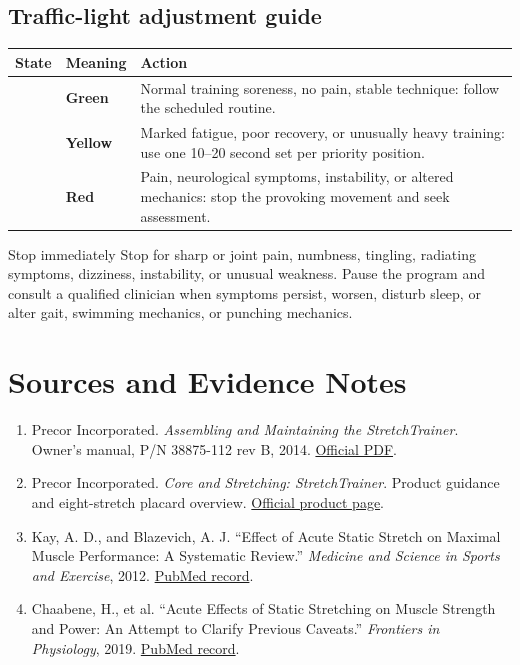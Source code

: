 \documentclass[10pt,letterpaper]{article}
\newcommand{\sourceurl}[2]{\href{#1}{#2}}
\begin{document}
\subsection{Traffic-light adjustment guide}

\begin{tabularx}{\textwidth}{@{}C{0.62in}L{1.25in}Y@{}}
\toprule
{}
\color{white}\textbf{State} & \color{white}\textbf{Meaning} & \color{white}\textbf{Action} \\
\midrule
{}\textcolor{Safe}{\Large{}} & \textbf{Green} & Normal training soreness, no pain, stable technique: follow the scheduled routine. \\
\textcolor{Caution}{\Large{}} & \textbf{Yellow} & Marked fatigue, poor recovery, or unusually heavy training: use one 10--20 second set per priority position. \\
\textcolor{Stop}{\Large{}} & \textbf{Red} & Pain, neurological symptoms, instability, or altered mechanics: stop the provoking movement and seek assessment. \\
\bottomrule
\end{tabularx}

\begin{warningbox}{Stop immediately}
Stop for sharp or joint pain, numbness, tingling, radiating symptoms, dizziness, instability, or unusual weakness. Pause the program and consult a qualified clinician when symptoms persist, worsen, disturb sleep, or alter gait, swimming mechanics, or punching mechanics.
\end{warningbox}

\section{Sources and Evidence Notes}

\begin{enumerate}
  \item Precor Incorporated. \emph{Assembling and Maintaining the StretchTrainer}. Owner's manual, P/N 38875-112 rev B, 2014. \sourceurl{https://static.precor.com/precor-at-home/legacy/38875-112_Assembling_and_Maintaining_the_StretchTrainer_EN_9-2014.pdf}{Official PDF}.
  \item Precor Incorporated. \emph{Core and Stretching: StretchTrainer}. Product guidance and eight-stretch placard overview. \sourceurl{https://www.precor.com/en-US/core-and-stretching}{Official product page}.
  \item Kay, A. D., and Blazevich, A. J. ``Effect of Acute Static Stretch on Maximal Muscle Performance: A Systematic Review.'' \emph{Medicine and Science in Sports and Exercise}, 2012. \sourceurl{https://pubmed.ncbi.nlm.nih.gov/21659901/}{PubMed record}.
  \item Chaabene, H., et al. ``Acute Effects of Static Stretching on Muscle Strength and Power: An Attempt to Clarify Previous Caveats.'' \emph{Frontiers in Physiology}, 2019. \sourceurl{https://pubmed.ncbi.nlm.nih.gov/31849713/}{PubMed record}.
\end{enumerate}
\end{document}
